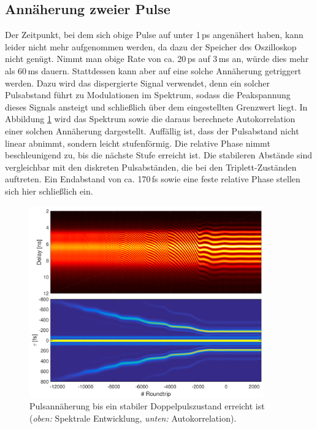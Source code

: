\documentclass[bachelor,       %
               twoside,        %
               BCOR10mm,       %
               liststotoc,nomtotoc,bibtotoc, %
               english,ngerman, %
               final,          %
               ]{GAUBM}
\begin{document}
\clearpage
\subsection{Annäherung zweier Pulse}
Der Zeitpunkt, bei dem sich obige Pulse auf unter 1\,ps angenähert haben, kann leider nicht mehr aufgenommen werden, da dazu der Speicher des Oszilloskop nicht genügt.
Nimmt man obige Rate von ca. 20\,ps auf 3\,ms an, würde dies mehr als 60\,ms dauern.
Stattdessen kann aber auf eine solche Annäherung getriggert werden.
Dazu wird das dispergierte Signal verwendet, denn ein solcher Pulsabstand führt zu Modulationen im Spektrum, sodass die Peakspannung dieses Signals ansteigt und schließlich über dem eingestellten Grenzwert liegt.
In Abbildung \ref{fig:StartAnnaeherung} wird das Spektrum sowie die daraus berechnete Autokorrelation einer solchen Annäherung dargestellt.
Auffällig ist, dass der Pulsabstand nicht linear abnimmt, sondern leicht stufenförmig.
Die relative Phase nimmt beschleunigend zu, bis die nächste Stufe erreicht ist.
Die stabileren Abstände sind vergleichbar mit den diskreten Pulsabständen, die bei den Triplett-Zuständen auftreten.
Ein Endabstand von ca. 170\,fs sowie eine feste relative Phase stellen sich hier schließlich ein.
\begin{figure}[!htb]
	\centering
	\includegraphics[width=0.9\textwidth]{figures/4ms_25GSA_400m_MLstart_Doppelpulse2_Annaeherung_280500}
	\caption{Pulsannäherung bis ein stabiler Doppelpulszustand erreicht ist\\
	(\textit{oben:} Spektrale Entwicklung, \textit{unten:} Autokorrelation).}
	\label{fig:StartAnnaeherung}
\end{figure}
\end{document}

